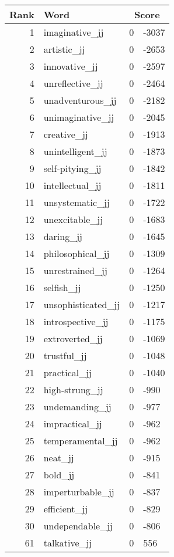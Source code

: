 \begin{longtable}[!htbp]{| rlr@{.}l |}
    \hline
    \textbf{Rank} & \textbf{Word} & \multicolumn{2}{c|}{\textbf{Score}} \\
    \hline
    \endhead
    1 & imaginative\_jj & 0 & -3037 \\
    2 & artistic\_jj & 0 & -2653 \\
    3 & innovative\_jj & 0 & -2597 \\
    4 & unreflective\_jj & 0 & -2464 \\
    5 & unadventurous\_jj & 0 & -2182 \\
    6 & unimaginative\_jj & 0 & -2045 \\
    7 & creative\_jj & 0 & -1913 \\
    8 & unintelligent\_jj & 0 & -1873 \\
    9 & self-pitying\_jj & 0 & -1842 \\
    10 & intellectual\_jj & 0 & -1811 \\
    11 & unsystematic\_jj & 0 & -1722 \\
    12 & unexcitable\_jj & 0 & -1683 \\
    13 & daring\_jj & 0 & -1645 \\
    14 & philosophical\_jj & 0 & -1309 \\
    15 & unrestrained\_jj & 0 & -1264 \\
    16 & selfish\_jj & 0 & -1250 \\
    17 & unsophisticated\_jj & 0 & -1217 \\
    18 & introspective\_jj & 0 & -1175 \\
    19 & extroverted\_jj & 0 & -1069 \\
    20 & trustful\_jj & 0 & -1048 \\
    21 & practical\_jj & 0 & -1040 \\
    22 & high-strung\_jj & 0 & -990 \\
    23 & undemanding\_jj & 0 & -977 \\
    24 & impractical\_jj & 0 & -962 \\
    25 & temperamental\_jj & 0 & -962 \\
    26 & neat\_jj & 0 & -915 \\
    27 & bold\_jj & 0 & -841 \\
    28 & imperturbable\_jj & 0 & -837 \\
    29 & efficient\_jj & 0 & -829 \\
    30 & undependable\_jj & 0 & -806 \\
    61 & talkative\_jj & 0 & 556 \\

\end{longtable}
